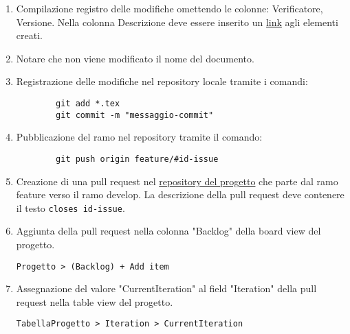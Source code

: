 \documentclass[a4paper, 12pt]{article}
\begin{document}
\begin{enumerate}
    \item Compilazione registro delle modifiche omettendo le colonne: Verificatore, Versione.
    Nella colonna Descrizione deve essere inserito un \hyperref[subsub:link]{link} agli elementi creati.
    
    \item Notare che non viene modificato il nome del documento. 
    
    
    \item Registrazione delle modifiche nel repository locale tramite i comandi:
    \begin{lstlisting}
        git add *.tex
        git commit -m "messaggio-commit"
    \end{lstlisting}

    \item Pubblicazione del ramo nel repository tramite il comando:
    \begin{lstlisting}
        git push origin feature/#id-issue
    \end{lstlisting}

    \item Creazione di una pull request nel \href{https://github.com/ALT-F4-eng/SorgentiDocumentazione}{repository del progetto} che parte dal ramo feature verso il ramo develop.
    La descrizione della pull request deve contenere il testo \lstinline|closes id-issue|.
    
    \item Aggiunta della pull request nella colonna "Backlog" della board view del progetto.
    
    \lstinline|Progetto > (Backlog) + Add item|
    
    \item Assegnazione del valore "CurrentIteration" al field "Iteration" della pull request nella table view del progetto.
    
    \lstinline|TabellaProgetto > Iteration > CurrentIteration|
   
\end{enumerate}
\end{document}
